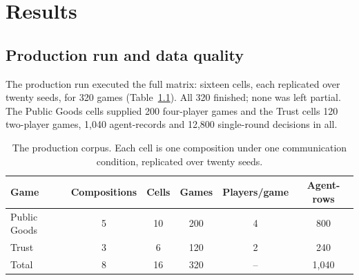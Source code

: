 \chapter{Results}
\label{ch:results}


\section{Production run and data quality}
\label{sec:res-dataquality}

The production run executed the full matrix: sixteen cells, each replicated over
twenty seeds, for 320 games (Table~\ref{tab:corpus}). All 320 finished; none was left
partial. The Public Goods cells supplied 200 four-player games and the Trust cells 120
two-player games, 1,040 agent-records and 12,800 single-round decisions in all.

\begin{table}[t]
\centering
\caption{The production corpus. Each cell is one composition under one communication
condition, replicated over twenty seeds.}
\label{tab:corpus}
\begin{tabular}{lccccc}
\toprule
Game & Compositions & Cells & Games & Players/game & Agent-rows \\
\midrule
Public Goods & 5 & 10 & 200 & 4 & 800 \\
Trust        & 3 &  6 & 120 & 2 & 240 \\
\midrule
Total        & 8 & 16 & 320 & -- & 1,040 \\
\bottomrule
\end{tabular}
\end{table}

